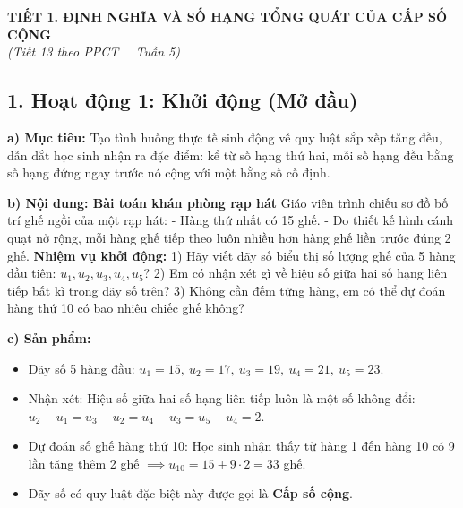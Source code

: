 \documentclass[12pt, a4paper]{article}
\begin{document}
\begin{center}  
    {\fontsize{13pt}{16pt}\selectfont \textbf{TIẾT 1. ĐỊNH NGHĨA VÀ SỐ HẠNG TỔNG QUÁT CỦA CẤP SỐ CỘNG}}\\[2pt]  
    \textit{(Tiết 13 theo PPCT \ \textbar \ Tuần 5)}  
\end{center}  
  
\subsection*{1. Hoạt động 1: Khởi động (Mở đầu)}  
  
\noindent \textbf{a) Mục tiêu:}  
Tạo tình huống thực tế sinh động về quy luật sắp xếp tăng đều, dẫn dắt học sinh nhận ra đặc điểm: kể từ số hạng thứ hai, mỗi số hạng đều bằng số hạng đứng ngay trước nó cộng với một hằng số cố định.  
  
\noindent \textbf{b) Nội dung: Bài toán khán phòng rạp hát}  
Giáo viên trình chiếu sơ đồ bố trí ghế ngồi của một rạp hát:  
- Hàng thứ nhất có 15 ghế.  
- Do thiết kế hình cánh quạt nở rộng, mỗi hàng ghế tiếp theo luôn nhiều hơn hàng ghế liền trước đúng 2 ghế.  
\textbf{Nhiệm vụ khởi động:}  
1) Hãy viết dãy số biểu thị số lượng ghế của 5 hàng đầu tiên: $u_1, u_2, u_3, u_4, u_5$?  
2) Em có nhận xét gì về hiệu số giữa hai số hạng liên tiếp bất kì trong dãy số trên?  
3) Không cần đếm từng hàng, em có thể dự đoán hàng thứ 10 có bao nhiêu chiếc ghế không?  
  
\noindent \textbf{c) Sản phẩm:}  
\begin{itemize}[leftmargin=0.8cm]  
    \item Dãy số 5 hàng đầu: $u_1 = 15,\ u_2 = 17,\ u_3 = 19,\ u_4 = 21,\ u_5 = 23$.  
    \item Nhận xét: Hiệu số giữa hai số hạng liên tiếp luôn là một số không đổi: $u_2 - u_1 = u_3 - u_2 = u_4 - u_3 = u_5 - u_4 = 2$.  
    \item Dự đoán số ghế hàng thứ 10: Học sinh nhận thấy từ hàng 1 đến hàng 10 có 9 lần tăng thêm 2 ghế $\implies u_{10} = 15 + 9 \cdot 2 = 33$ ghế.  
    \item Dãy số có quy luật đặc biệt này được gọi là \textbf{Cấp số cộng}.  
\end{itemize}  
  
\end{document}
